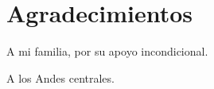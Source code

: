 \chapter*{Agradecimientos}

\begin{flushright}
    A mi familia, por su apoyo incondicional. 
        
    A los Andes centrales.
\end{flushright}

